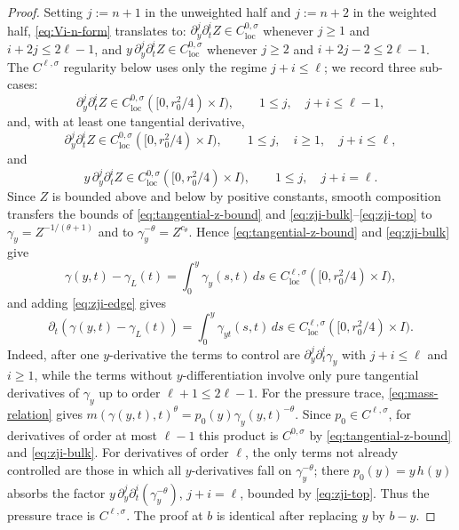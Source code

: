 \documentclass[11pt]{amsart}
\newcommand{\dd}{\,d}
\newcommand{\loc}{\mathrm{loc}}
\begin{document}
\begin{proof}
Setting \(j:=n+1\) in the unweighted half and \(j:=n+2\) in the weighted
half, \eqref{eq:Vi-n-form} translates to: \(\partial_y^j\partial_t^iZ
\in C^{0,\sigma}_{\loc}\) whenever \(j\ge1\) and \(i+2j\le2\ell-1\), and
\(y\,\partial_y^j\partial_t^iZ\in C^{0,\sigma}_{\loc}\) whenever
\(j\ge2\) and \(i+2j-2\le2\ell-1\). The \(C^{\ell,\sigma}\) regularity
below uses only the regime \(j+i\le\ell\); we record three sub-cases:
\begin{equation}
\label{eq:zji-bulk}
        \partial_y^j\partial_t^iZ\in C^{0,\sigma}_{\loc}([0,r_0^2/4)\times I),
        \qquad 1\le j,\quad j+i\le\ell-1,
\end{equation}
and, with at least one tangential derivative,
\begin{equation}
\label{eq:zji-edge}
        \partial_y^j\partial_t^iZ\in C^{0,\sigma}_{\loc}([0,r_0^2/4)\times I),
        \qquad 1\le j,\quad i\ge1,\quad j+i\le\ell,
\end{equation}
and
\begin{equation}
\label{eq:zji-top}
        y\,\partial_y^j\partial_t^iZ\in C^{0,\sigma}_{\loc}([0,r_0^2/4)\times I),
        \qquad 1\le j,\quad j+i=\ell .
\end{equation}
Since \(Z\) is bounded above and below by positive constants, smooth
composition transfers the bounds of \eqref{eq:tangential-z-bound} and
\eqref{eq:zji-bulk}--\eqref{eq:zji-top} to
\(\gamma_y=Z^{-1/(\theta+1)}\) and to
\(\gamma_y^{-\theta}=Z^{c_\theta}\). Hence
\eqref{eq:tangential-z-bound} and \eqref{eq:zji-bulk} give
\[
        \gamma(y,t)-\gamma_L(t)
        =\int_0^y \gamma_y(s,t)\dd s
        \in C^{\ell,\sigma}_{\loc}([0,r_0^2/4)\times I),
\]
and adding \eqref{eq:zji-edge} gives
\[
        \partial_t\!\left(\gamma(y,t)-\gamma_L(t)\right)
        =\int_0^y \gamma_{yt}(s,t)\dd s
        \in C^{\ell,\sigma}_{\loc}([0,r_0^2/4)\times I).
\]
Indeed, after one \(y\)-derivative the terms to control are
\(\partial_y^j\partial_t^i\gamma_y\) with \(j+i\le\ell\) and \(i\ge1\), while
the terms without \(y\)-differentiation involve only pure tangential
derivatives of \(\gamma_y\) up to order \(\ell+1\le2\ell-1\).
For the pressure trace, \eqref{eq:mass-relation} gives
\(m(\gamma(y,t),t)^\theta=p_0(y)\gamma_y(y,t)^{-\theta}\).
Since \(p_0\in C^{\ell,\sigma}\), for derivatives of order at most
\(\ell-1\) this product is \(C^{0,\sigma}\) by
\eqref{eq:tangential-z-bound} and \eqref{eq:zji-bulk}. For derivatives
of order \(\ell\), the only terms not already controlled are those in
which all \(y\)-derivatives fall on \(\gamma_y^{-\theta}\); there
\(p_0(y)=y\,h(y)\) absorbs the factor
\(y\,\partial_y^j\partial_t^i(\gamma_y^{-\theta})\), \(j+i=\ell\),
bounded by \eqref{eq:zji-top}. Thus the pressure trace is
\(C^{\ell,\sigma}\). The proof at \(b\) is identical after replacing
\(y\) by \(b-y\).
\end{proof}
\end{document}
